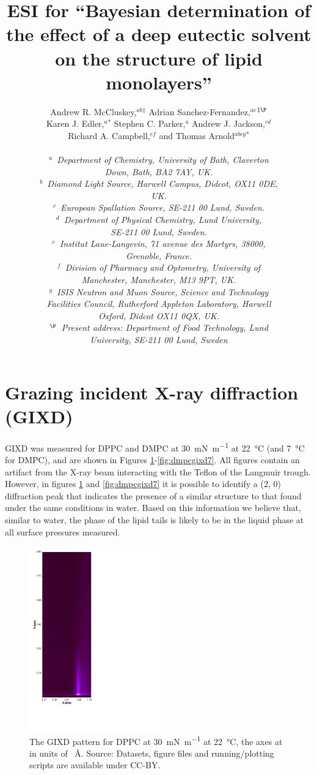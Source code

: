 \documentclass[11pt,a4paper]{article}
\author{Andrew R. McCluskey,\textit{$^{ab}$}$^{\ddag}$ Adrian Sanchez-Fernandez,\textit{$^{ac}$}$^{\ddag\P}$ \\
Karen J. Edler,\textit{$^{a}$}$^{\ast}$ Stephen C. Parker,\textit{$^{a}$} Andrew J. Jackson,\textit{$^{cd}$} \\
Richard A. Campbell,\textit{$^{ef}$} and Thomas Arnold\textit{$^{abcg}$}$^{\ast}$ \\
 \\
\textit{$^{a}$~Department of Chemistry, University of Bath, Claverton} \\
\textit{Down, Bath, BA2 7AY, UK.} \\
\textit{$^{b}$~Diamond Light Source, Harwell Campus, Didcot, OX11 0DE,} \\
\textit{UK.} \\
\textit{$^{c}$~European Spallation Source, SE-211 00 Lund, Sweden.} \\
\textit{$^{d}$~Department of Physical Chemistry, Lund University,} \\
\textit{SE-211 00 Lund, Sweden.} \\
\textit{$^{e}$~Institut Laue-Langevin, 71 avenue des Martyrs, 38000,} \\
\textit{Grenoble, France.} \\
\textit{$^{f}$~Division of Pharmacy and Optometry, University of} \\
\textit{Manchester, Manchester, M13 9PT, UK.} \\
\textit{$^{g}$~ISIS Neutron and Muon Source, Science and Technology} \\
\textit{Facilities Council, Rutherford Appleton Laboratory, Harwell} \\
\textit{Oxford, Didcot OX11 0QX, UK.} \\
\textit{$^{\P}$~Present address: Department of Food Technology, Lund} \\
\textit{University, SE-211 00 Lund, Sweden}}
\title{ESI for ``Bayesian determination of the effect of a deep eutectic solvent on the structure of lipid monolayers''}
\date{}
\begin{document}
\maketitle
\section{Grazing incident X-ray diffraction (GIXD)}
GIXD was measured for DPPC and DMPC at \SI{30}{\milli\newton\per\meter} at \SI{22}{\celsius} (and \SI{7}{\celsius} for DMPC), and are shown in Figures \ref{fig:dppcgixd}-\ref{fig:dmpcgixd7}. All figures contain an artifact from the X-ray beam interacting with the Teflon of the Langmuir trough. However, in figures \ref{fig:dppcgixd} and \ref{fig:dmpcgixd7} it is possible to identify a (2, 0) diffraction peak that indicates the presence of a similar structure to that found under the same conditions in water.\cite{Watkins2009} Based on this information we believe that, similar to water, the phase of the lipid tails is likely to be in the liquid phase at all surface pressures measured. 
\begin{figure}[h]
	\centering
	\includegraphics[width=0.50\textwidth]{figures/206041}
	\caption{The GIXD pattern for DPPC at \SI{30}{\milli\newton\per\meter} at \SI{22}{\celsius}, the axes at in units of \si{\per\angstrom}. Source: Datasets, figure files and running/plotting scripts are available under CC-BY.\cite{mccluskey_2018}}
	\label{fig:dppcgixd}
\end{figure}
\end{document}
